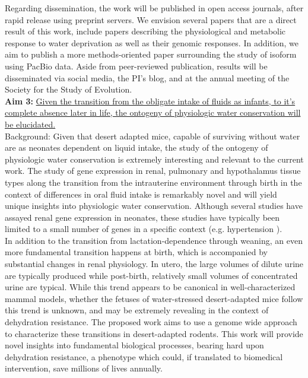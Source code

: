 Regarding dissemination, the work will be published in open access journals, after rapid release using preprint servers. We envision several papers that are a direct result of this work, include papers describing the physiological and metabolic response to water deprivation as well as their genomic responses. In addition, we aim to publish a more methods-oriented paper surrounding the study of isoform using PacBio data. Aside from peer-reviewed publication, results will be disseminated via social media, the PI's blog, and at the annual meeting of the Society for the Study of Evolution. \\       




\noindent \textbf{Aim 3:} \ul{Given the transition from the obligate intake of fluids as infants, to it’s complete absence later in life, the ontogeny of physiologic water conservation will be elucidated.} \\

Background: Given that desert adapted mice, capable of surviving without water are as neonates dependent on liquid intake, {the study of the ontogeny of physiologic water conservation is extremely interesting and relevant to the current work.} The study of gene expression in renal, pulmonary and hypothalamus tissue types along the transition from the intrauterine environment through birth in the context of differences in oral fluid intake is remarkably novel and will yield unique insights into physiologic water conservation. Although several studies have assayed renal gene expression in neonates, these studies have typically been limited to a small number of genes in a specific context (e.g. hypertension \citep{Sampson:2012hb,Shanmugam:1996ed}). \\

In addition to the transition from lactation-dependence through weaning, an even more fundamental transition happens at birth, which is accompanied by substantial changes in renal physiology. In utero, the large volumes of dilute urine are typically produced \citep{Wintour:1997ts} while post-birth, relatively small volumes of concentrated urine are typical. While this trend appears to be canonical in well-characterized mammal models, whether the fetuses of water-stressed desert-adapted mice follow this trend is unknown, and may be extremely revealing in the context of dehydration resistance. The proposed work aims to use a genome wide approach to characterize these transitions in desert-adapted rodents. This work will provide novel insights into fundamental biological processes, bearing hard upon dehydration resistance, a phenotype which could, if translated to biomedical intervention, save millions of lives annually.  \\  


